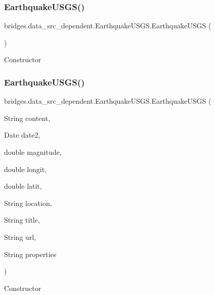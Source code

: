 \subsubsection{\texorpdfstring{Earthquake\+U\+S\+G\+S()}{EarthquakeUSGS()}\hspace{0.1cm}{\footnotesize\ttfamily [1/3]}}
{\footnotesize\ttfamily bridges.\+data\+\_\+src\+\_\+dependent.\+Earthquake\+U\+S\+G\+S.\+Earthquake\+U\+S\+GS (\begin{DoxyParamCaption}{ }\end{DoxyParamCaption})}

Constructor \mbox{\label{classbridges_1_1data__src__dependent_1_1_earthquake_u_s_g_s_a767aa387d5ce45c98ad01394e0937abe}} 
\subsubsection{\texorpdfstring{Earthquake\+U\+S\+G\+S()}{EarthquakeUSGS()}\hspace{0.1cm}{\footnotesize\ttfamily [2/3]}}
{\footnotesize\ttfamily bridges.\+data\+\_\+src\+\_\+dependent.\+Earthquake\+U\+S\+G\+S.\+Earthquake\+U\+S\+GS (\begin{DoxyParamCaption}\item[{String}]{content,  }\item[{Date}]{date2,  }\item[{double}]{magnitude,  }\item[{double}]{longit,  }\item[{double}]{latit,  }\item[{String}]{location,  }\item[{String}]{title,  }\item[{String}]{url,  }\item[{String}]{properties }\end{DoxyParamCaption})}

Constructor


